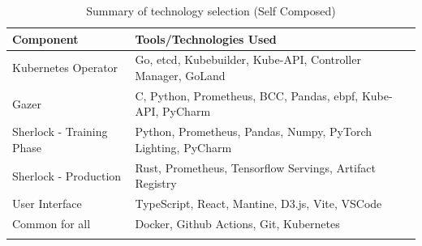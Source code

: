 \begin{longtable}{|p{43mm}|p{110mm}|}
    \hline
    \textbf{Component} &
    \textbf{Tools/Technologies Used} \\ \hline

    Kubernetes Operator &
    Go, etcd, Kubebuilder, Kube-API, Controller Manager, GoLand \\ \hline

    Gazer &
    C, Python, Prometheus, BCC, Pandas, \ac{ebpf}, Kube-API, PyCharm \\ \hline

    Sherlock - Training Phase &
    Python, Prometheus, Pandas, Numpy, PyTorch Lighting, PyCharm \\ \hline

    Sherlock - Production &
    Rust, Prometheus, Tensorflow Servings, Artifact Registry \\ \hline

    User Interface &
    TypeScript, React, Mantine, D3.js, Vite, VSCode \\ \hline

    Common for all &
    Docker, Github Actions, Git, Kubernetes \\ \hline

    \caption{Summary of technology selection (Self Composed)}
\end{longtable}